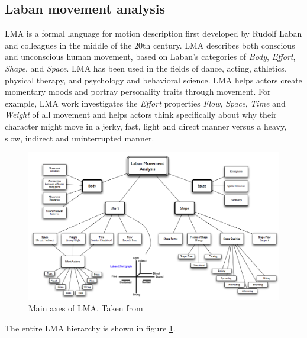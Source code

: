 \documentclass[journal]{journal}
\begin{document}
\subsection{Laban movement analysis}
LMA is a formal language for motion description first developed by Rudolf Laban \cite{Laban} and colleagues in the middle of the 20th century. 
LMA describes both conscious and unconscious human movement, based on Laban's categories of \textit{Body}, \textit{Effort}, \textit{Shape}, and \textit{Space}. 
LMA has been used in the fields of dance, acting, athletics, physical therapy, and psychology and behavioral science.
LMA helps actors create momentary moods and portray personality traits through
movement. For example, LMA work investigates the \textit{Effort} properties
\textit{Flow}, \textit{Space}, \textit{Time} and \textit{Weight} of all movement and helps actors 
think specifically about why their character might move in a jerky, fast, light and direct manner 
versus a heavy, slow, indirect and uninterrupted manner.
\begin{figure}[ht]
\centering
\includegraphics[width=\textwidth]{laban.png}
\caption{Main axes of LMA. Taken from \cite{labanTree}}
\label{labanTree}
\end{figure}
The entire LMA hierarchy is shown in figure \ref{labanTree}.
\end{document}
